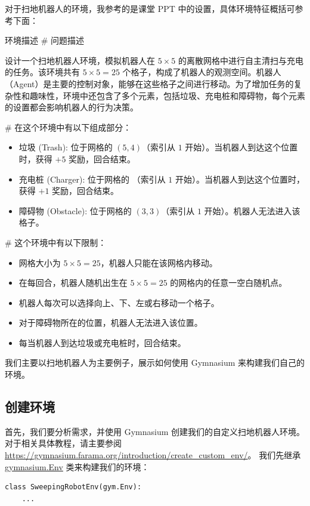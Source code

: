 对于扫地机器人的环境，我参考的是课堂 PPT 中的设置，具体环境特征概括可参考下面：

\begin{definition*}{环境描述}
\# 问题描述

    设计一个扫地机器人环境，模拟机器人在 \(5 \times 5\) 的离散网格中进行自主清扫与充电的任务。该环境共有 \(5 \times 5 = 25\) 个格子，构成了机器人的观测空间。机器人（Agent）是主要的控制对象，能够在这些格子之间进行移动。为了增加任务的复杂性和趣味性，环境中还包含了多个元素，包括垃圾、充电桩和障碍物，每个元素的设置都会影响机器人的行为决策。

\# 在这个环境中有以下组成部分：
    \begin{itemize}
        \item 垃圾 (Trash): 位于网格的 \(\left( 5, 4 \right)\)（索引从 \(1\) 开始）。当机器人到达这个位置时，获得 \(+5\) 奖励，回合结束。
        \item 充电桩 (Charger): 位于网格的 （索引从 \(1\) 开始）。当机器人到达这个位置时，获得 \(+1\) 奖励，回合结束。
        \item 障碍物 (Obstacle): 位于网格的 \(\left( 3, 3 \right)\)（索引从 \(1\) 开始）。机器人无法进入该格子。
    \end{itemize}

\# 这个环境中有以下限制：
\begin{itemize}
    \item 网格大小为 \(5 \times 5 = 25\)，机器人只能在该网格内移动。
    \item 在每回合，机器人随机出生在 \(5 \times 5 = 25\) 的网格内的任意一空白随机点。
    \item 机器人每次可以选择向上、下、左或右移动一个格子。
    \item 对于障碍物所在的位置，机器人无法进入该位置。
    \item 每当机器人到达垃圾或充电桩时，回合结束。
\end{itemize}
\end{definition*}

我们主要以扫地机器人为主要例子，展示如何使用 Gymnasium 来构建我们自己的环境。

\subsection{创建环境}

首先，我们要分析需求，并使用 Gymnasium 创建我们的自定义扫地机器人环境。
对于相关具体教程，请主要参阅 \href{https://gymnasium.farama.org/introduction/create_custom_env/}{https://gymnasium.farama.org/introduction/create\_custom\_env/}。
我们先继承 \href{https://gymnasium.farama.org/api/env/#gymnasium.Env}{\textsf{gymnasium.Env}} 类来构建我们的环境：
\begin{verbatim}
class SweepingRobotEnv(gym.Env):
    ...
\end{verbatim}

